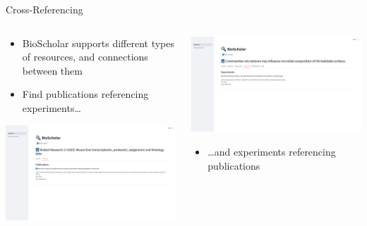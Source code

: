 \documentclass[t,aspectratio=169]{beamer}
\begin{document}
\begin{frame}{Cross-Referencing}
	\begin{columns}[T]
		\begin{column}{.48\textwidth}
            \begin{itemize}
                \item BioScholar supports different types of resources, and connections between them
                \item Find publications referencing experiments\dots
            \end{itemize}
            \includegraphics[width=\textwidth]{images/4_2_exp_to_pub.png}
        \end{column}
		\begin{column}{.48\textwidth}
            \includegraphics[width=\textwidth]{images/4_1_pub_to_exp.png}
            \begin{itemize}
                \item \dots and experiments referencing publications
            \end{itemize}
        \end{column}
    \end{columns}
\end{frame}
\end{document}
